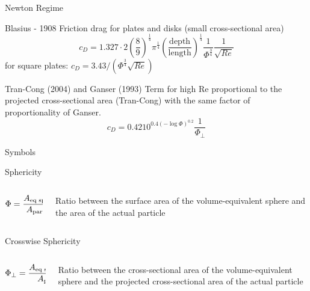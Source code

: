 \documentclass[11pt]{beamer}
\begin{document}
	\begin{frame}{Newton Regime}
		\begin{block}{Blasius - 1908}
			Friction drag for plates and disks (small cross-sectional area)
			\begin{equation*}
				c_D = 1.327 \cdot 2 \left(\frac{8}{9}\right)^{\frac{1}{4}} \pi^{\frac{1}{4}} \left(\frac{\text{depth}}{\text{length}}\right)^{\frac{1}{4}} \frac{1}{\Phi^{\frac{3}{4}}} \frac{1}{\sqrt{Re}}
			\end{equation*}
			for square plates: \quad $ c_D = 3.43 / (\Phi^{\frac{3}{4}} \sqrt{Re}) $
		\end{block}
	
		\begin{block}{Tran-Cong (2004) and Ganser (1993)}
			Term for high Re proportional to the projected cross-sectional area (Tran-Cong) with the same factor of proportionality of Ganser.
			\begin{equation*}
				c_D = 0.4210^{0.4(-\log \Phi)^{0.2}} \frac{1}{\Phi_{\perp}}
			\end{equation*}
		\end{block}
	\end{frame}

	\begin{frame}{Symbols}
		\begin{block}{Sphericity}
			\begin{columns}[T]
				\begin{column}{.4\textwidth}
					\begin{equation*}
						\Phi = \dfrac{A_{\textup{eq sphere}}}{A_{\textup{particle}}}
					\end{equation*}
				\end{column}
			
				\begin{column}{.6\textwidth}
					Ratio between the surface area of the volume-equivalent sphere and the area of the actual particle
				\end{column}
			\end{columns}
		\end{block}
		\vfill
		\begin{block}{Crosswise Sphericity}
			\begin{columns}[T]
				\begin{column}{.4\textwidth}
					\begin{equation*}
					\Phi_{\perp} = \dfrac{A_{\textup{eq sphere, cross}}} {A_{\textup{particle}, \perp}}
					\end{equation*}
				\end{column}
				
				\begin{column}{.6\textwidth}
					Ratio between the cross-sectional area of the volume-equivalent sphere and the projected cross-sectional area of the actual particle
				\end{column}
			\end{columns}
		\end{block}
	\end{frame}
\end{document}
